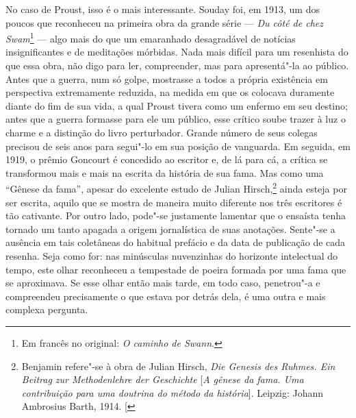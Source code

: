 No caso de Proust, isso é o mais interessante. Souday foi, em 1913, um
dos poucos que reconheceu na primeira obra da grande série --- \emph{Du côté de chez Swam}\footnote{Em francês no original: \emph{O
caminho de Swann}.} --- algo mais do que um emaranhado desagradável de
notícias insignificantes e de meditações mórbidas. Nada mais difícil
para um resenhista do que essa obra, não digo para ler, compreender, mas
para apresentá"-la ao público. Antes que a guerra, num só golpe,
mostrasse a todos a própria existência em perspectiva extremamente
reduzida, na medida em que os colocava duramente diante do fim de sua
vida, a qual Proust tivera como um enfermo em seu destino; antes que a
guerra formasse para ele um público, esse crítico soube trazer à luz o
charme e a distinção do livro perturbador. Grande número de seus colegas
precisou de seis anos para segui"-lo em sua posição de vanguarda. Em
seguida, em 1919, o prêmio Goncourt é concedido ao escritor e, de lá
para cá, a crítica se transformou mais e mais na escrita da história de
sua fama. Mas como uma ``Gênese da fama'', apesar do excelente estudo de
Julian Hirsch,\footnote{Benjamin refere"-se à obra de Julian Hirsch,
  \emph{Die Genesis des Ruhmes. Ein Beitrag zur Methodenlehre der
  Geschichte} {[}\emph{A gênese da fama. Uma contribuição para uma
  doutrina do método da história}{]}. Leipzig: Johann Ambrosius Barth,
  1914. {[}\versal{N. E.}{]}} ainda esteja por ser escrita, aquilo que se mostra
de maneira muito diferente nos três escritores é tão cativante. Por
outro lado, pode"-se justamente lamentar que o ensaísta tenha tornado um
tanto apagada a origem jornalística de suas anotações. Sente"-se a
ausência em tais coletâneas do habitual prefácio e da data de publicação
de cada resenha. Seja como for: nas minúsculas nuvenzinhas do horizonte
intelectual do tempo, este olhar reconheceu a tempestade de poeira
formada por uma fama que se aproximava. Se esse olhar então mais tarde,
em todo caso, penetrou"-a e compreendeu precisamente o que estava por
detrás dela, é uma outra e mais complexa pergunta.

